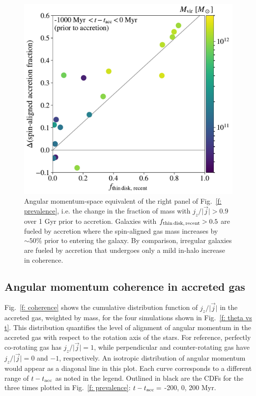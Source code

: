\documentclass[fleqn,usenatbib]{mnras}
\newcommand{\fthin}{f_{\rm thin\,disk,\,recent}}
\newcommand{\tacc}{t_{\rm acc}}
\begin{document}
\begin{figure}
    \centering
    \includegraphics[width=\columnwidth]{figures/variations/relative_to_accretion/prevalence/delta_smooth_jdisk_frac_v_thin_disk_frac_recent.pdf}
    \caption{
    Angular momentum-space equivalent of the right panel of Fig.~\ref{f: prevalence}, i.e. the change in the fraction of mass with $j_z/\vert \vec j \vert > 0.9$ over 1 Gyr prior to accretion.
    Galaxies with $\fthin > 0.5$ are fueled by accretion where the spin-aligned gas mass increases by $\sim 50\%$ prior to entering the galaxy.
    By comparison, irregular galaxies are fueled by accretion that undergoes only a mild in-halo increase in coherence.
    }
    \label{f: prevalence - angular momentum}
\end{figure}

\subsection{Angular momentum coherence in accreted gas}
\label{s: mechanics -- coherence}

Fig.~\ref{f: coherence} shows the cumulative distribution function of $j_z / \vert \vec j \vert$ in the accreted gas, weighted by mass, for the four simulations shown in Fig.~\ref{f: theta vs t}.
This distribution quantifies the level of alignment of angular momentum in the accreted gas with respect to the rotation axis of the stars.
For reference, perfectly co-rotating gas has $j_z / \vert \vec j \vert = 1$, while perpendicular and counter-rotating gas have $j_z / \vert \vec j \vert = 0$ and $-1$, respectively.
An isotropic distribution of angular momentum would appear as a diagonal line in this plot. 
Each curve corresponds to a different range of $t - \tacc$ as noted in the legend. 
Outlined in black are the CDFs for the three times plotted in Fig.~\ref{f: prevalence}: $t - \tacc =$ -200, 0, 200 Myr.
\end{document}
